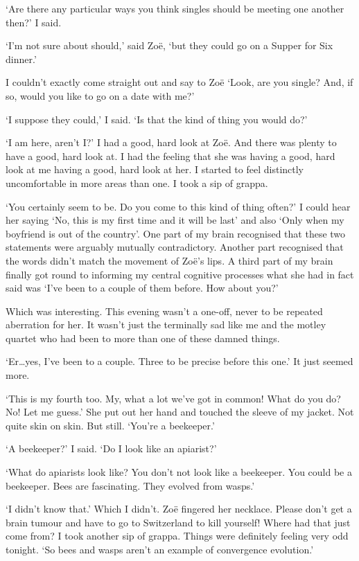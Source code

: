 `Are there any particular ways you think singles should be meeting
one another then?' I said.

`I'm not sure about {\twelveit should\/},' said Zo{\"e}, `but they
could go on a Supper for Six dinner.'

I couldn't exactly come straight out and say to Zo{\"e} `Look, are
you single? And, if so, would you like to go on a date with me?'

`I suppose they could,' I said. `Is that the kind of thing you would
do?'

`I am here, aren't I?' I had a good, hard look at Zo{\"e}. And
there was plenty to have a good, hard look at. I had the feeling
that she was having a good, hard look at me having a good, hard
look at her. I started to feel distinctly uncomfortable in more
areas than one. I took a sip of grappa.

`You certainly seem to be. Do you come to this kind of thing often?'
I could hear her saying `No, this is my first time and it will be
last' and also `Only when my boyfriend is out
of the country'. One part of my brain recognised that these two
statements were arguably mutually contradictory. Another part recognised that the words
didn't match the movement of Zo{\"e}'s lips. A third part of my brain finally got round to
informing my central cognitive processes what she had in fact said was `I've been to a couple of them before. How about you?'

Which was interesting. This evening wasn't a one-off, never to be
repeated aberration for her. It wasn't just the terminally sad like me and the
motley quartet who had been to more than one of these damned things.

`Er\dots yes, I've been to a couple. Three to be precise before this
one.' It just seemed more.

`This is my fourth too. My, what a lot we've got in common! What do
you do? No! Let me guess.' She put out her hand and touched the sleeve of my jacket. Not quite skin on skin. But still. `You're a beekeeper.'

`A beekeeper?' I said. `Do I look like an apiarist?'

`What do apiarists look like? You don't {\twelveit not\/} look like a beekeeper. You could be a beekeeper. Bees are fascinating. They evolved from wasps.'

`I didn't know that.' Which I didn't. Zo{\"e} fingered her necklace. Please don't get a brain tumour and have to go to Switzerland to kill yourself! Where had {\twelveit that\/} just come from? I took another sip of grappa. Things were definitely feeling very odd tonight. `So bees and wasps aren't an example of convergence evolution.'

